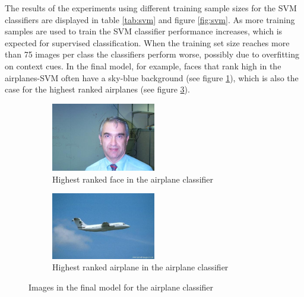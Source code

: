 The results of the experiments using different training sample sizes for the SVM classifiers are displayed in table \ref{tab:svm} and figure \ref{fig:svm}. As more training samples are used to train the SVM classifier performance increases, which is expected for supervised classification. When the training set size reaches more than 75 images per class the classifiers perform worse, possibly due to overfitting on context cues. In the final model, for example, faces that rank high in the airplanes-SVM often have a sky-blue background (see figure \ref{photo:man}), which is also the case for the highest ranked airplanes (see figure \ref{photo:airplane}).
\begin{figure}[H]
\begin{subfigure}[b]{0.5\textwidth}
\begin{center}
\includegraphics[width=0.5\textwidth]{img003}
\caption{Highest ranked face in the airplane classifier}
\label{photo:man}
\end{center}
\end{subfigure}
\begin{subfigure}[b]{0.5\textwidth}
\begin{center}
\includegraphics[width=0.5\textwidth]{img010}
\caption{Highest ranked airplane in the airplane classifier}
\label{photo:airplane}
\end{center}
\end{subfigure}
\caption{Images in the final model for the airplane classifier}
\end{figure}
  

